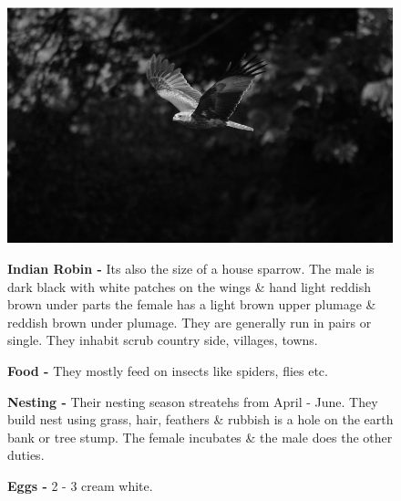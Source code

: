 \begin{figure}[H]
\begin{center}
\includegraphics{figure/Land_birds/01_pariah_kite/pariah-kite.eps}
\end{center}
\medskip
\noindent
{\bf Indian Robin -} Its also the size of a house sparrow. The male is dark black with white patches on the wings \& hand light reddish brown under parts the female has a light brown upper plumage \& reddish brown under plumage. They are generally run in pairs or single. They inhabit scrub country side, villages, towns.

\medskip
{\bf Food -} They mostly feed on insects like spiders, flies etc.

{\bf Nesting -} Their nesting season streatehs from April - June. They build nest using grass, hair, feathers  \& rubbish is a hole on the earth bank or tree stump. The female incubates \& the male does the other duties.

{\bf Eggs -} 2 - 3 cream white.
\end{figure}

\vfill\eject

~\phantom{a}
\vfill

